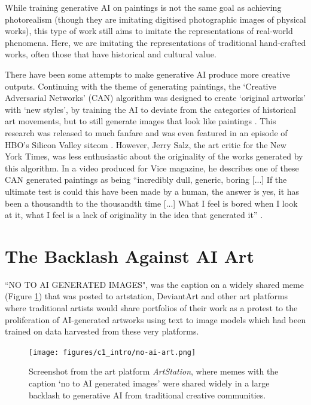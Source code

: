 While training generative AI on paintings is not the same goal as achieving photorealism (though they are imitating digitised photographic images of physical works), this type of work still aims to imitate the representations of real-world phenomena. Here, we are imitating the representations of traditional hand-crafted works, often those that have historical and cultural value.

There have been some attempts to make generative AI produce more creative outputs. 
Continuing with the theme of generating paintings, the ‘Creative Adversarial Networks’ (CAN) algorithm was designed to create ‘original artworks’ with ‘new styles’, by training the AI to deviate from the categories of historical art movements, but to still generate images that look like paintings \cite{elgammal2017can}. 
This research was released to much fanfare and was even featured in an episode of HBO’s Silicon Valley sitcom \citep{elhoseiny2019hbo}. 
However, Jerry Salz, the art critic for the New York Times, was less enthusiastic about the originality of the works generated by this algorithm. 
In a video produced for Vice magazine, he describes one of these CAN generated paintings as being “incredibly dull, generic, boring [...] If the ultimate test is could this have been made by a human, the answer is yes, it has been a thousandth to the thousandth time [...] What I feel is bored when I look at it, what I feel is a lack of originality in the idea that generated it” \citep{saltz2018aiart}. 

\section{The Backlash Against AI Art}

``NO TO AI GENERATED IMAGES", was the caption on a widely shared meme (Figure \ref{fig:c1:no-ai-art}) that was posted to artstation, DeviantArt and other art platforms where traditional artists would share portfolios of their work as a protest to the proliferation of AI-generated artworks using text to image models which had been trained on data harvested from these very platforms. 

\begin{figure}[!htb]
    \centering
    \captionsetup{justification=centering}
    \texttt{[image: figures/c1\_intro/no-ai-art.png]}
    \caption['No-AI memes being shared on the platform ArtStation]{Screenshot from the art platform \textit{ArtStation}, where memes with the caption `no to AI generated images' were shared widely in a large backlash to generative AI from traditional creative communities.}
    \label{fig:c1:no-ai-art}
\end{figure}

